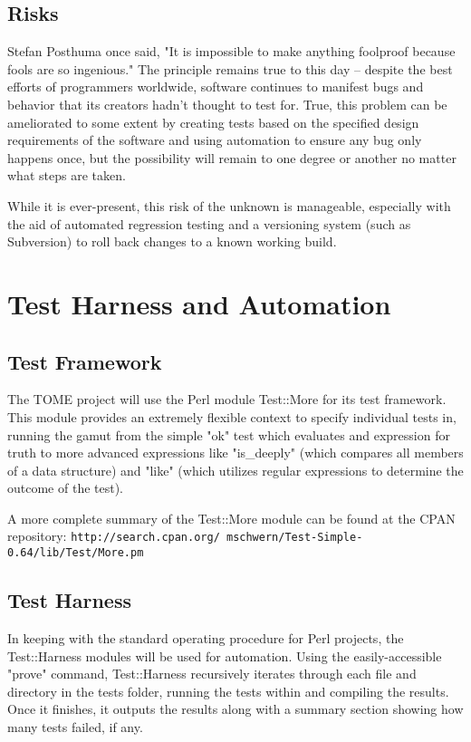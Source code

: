 \documentclass[12pt,titlepage]{article}
\begin{document}
\subsection{Risks}
Stefan Posthuma once said, "It is impossible to make anything foolproof because fools are so ingenious."  The principle remains true to this day -- despite the best efforts of programmers worldwide, software continues to manifest bugs and behavior that its creators hadn't thought to test for.  True, this problem can be ameliorated to some extent by creating tests based on the specified design requirements of the software and using automation to ensure any bug only happens once, but the possibility will remain to one degree or another no matter what steps are taken.

While it is ever-present, this risk of the unknown is manageable, especially with the aid of automated regression testing and a versioning system (such as Subversion) to roll back changes to a known working build.

\section{Test Harness and Automation}
\subsection{Test Framework}
The TOME project will use the Perl module Test::More for its test framework.  This module provides an extremely flexible context to specify individual tests in, running the gamut from the simple "ok" test which evaluates and expression for truth to more advanced expressions like "is_deeply" (which compares all members of a data structure) and "like" (which utilizes regular expressions to determine the outcome of the test).

A more complete summary of the Test::More module can be found at the CPAN repository: \texttt{http://search.cpan.org/~mschwern/Test-Simple-0.64/lib/Test/More.pm}

\subsection{Test Harness}
In keeping with the standard operating procedure for Perl projects, the Test::Harness modules will be used for automation.  Using the easily-accessible "prove" command, Test::Harness recursively iterates through each file and directory in the tests folder, running the tests within and compiling the results.  Once it finishes, it outputs the results along with a summary section showing how many tests failed, if any.
\end{document}

